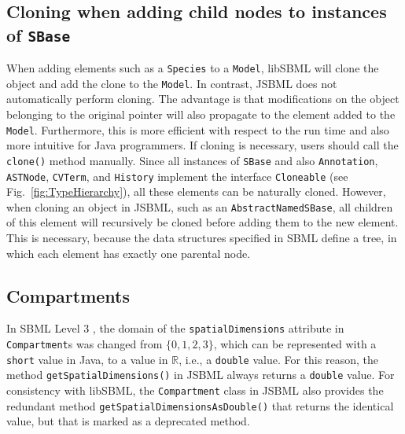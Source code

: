 \subsection{Cloning when adding child nodes to instances of \texttt{SBase}}

When adding elements such as a \texttt{Species}
%
to a \texttt{Model}, libSBML will
clone the object and add the clone to the \texttt{Model}. In contrast,
JSBML does
not automatically perform cloning. The advantage is that modifications on the
object belonging to the original pointer will also propagate to the element
added to the \texttt{Model}. Furthermore, this is more efficient with respect to
the run time and also more intuitive for Java programmers. If cloning is
necessary, users should call the \texttt{clone()} method manually. Since all instances of \texttt{SBase} and also
\texttt{Annotation}, \texttt{ASTNode}, \texttt{CVTerm}, and \texttt{History} implement
the interface \texttt{Cloneable} (see Fig.~\vref{fig:TypeHierarchy}), all these
elements can be naturally cloned. However, when cloning an object in
JSBML, such as an \texttt{AbstractNamedSBase},
%
all children of this element will recursively be cloned before adding them to
the new element. This is necessary, because the data structures specified in
SBML
%
define a tree, in which each element has exactly one parental node.

\subsection{Compartments}

In SBML Level 3
%
\citep{Hucka2010a}, the domain of the \texttt{spatialDimensions} attribute in
\texttt{Compartment}s was changed from $\lbrace 0, 1, 2, 3\rbrace$, which can be
represented with a \texttt{short} value in Java, to a value in $\mathbb{R}$,
i.e., a \texttt{double} value. For this reason, the method
\texttt{getSpatialDimensions()} in JSBML
always returns a \texttt{double} value. For consistency with libSBML, the
\texttt{Compartment} class in JSBML also provides the redundant method
\texttt{getSpatialDimensionsAsDouble()} that returns the identical value, but
that is marked as a deprecated method.
%
%
%


